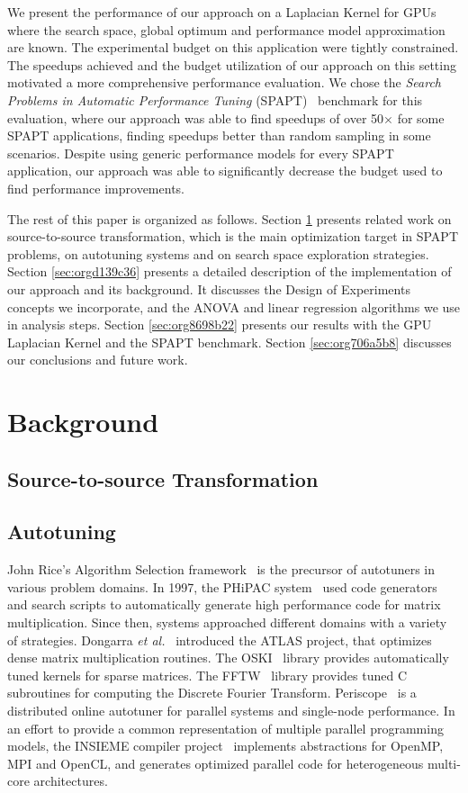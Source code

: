 \documentclass[conference]{IEEEtran}
\begin{document}
We present the performance of our approach on a Laplacian Kernel for GPUs where
the search space, global optimum and performance model approximation are known.
The experimental budget on this application were tightly constrained. The
speedups achieved and the budget utilization of our approach on this setting
motivated a more comprehensive performance evaluation. We chose the \emph{Search
Problems in Automatic Performance Tuning}
(SPAPT)~\cite{balaprakash2012spapt} benchmark for this evaluation, where
our approach was able to find speedups of over 50\(\times\) for some SPAPT
applications, finding speedups better than random sampling in some scenarios.
Despite using generic performance models for every SPAPT application, our
approach was able to significantly decrease the budget used to find performance
improvements.

The rest of this paper is organized as follows. Section \ref{sec:orgbef4f12} presents
related work on source-to-source transformation, which is the main optimization
target in SPAPT problems, on autotuning systems and on search space exploration
strategies. Section \ref{sec:orgd139c36} presents a
detailed description of the implementation of our approach and its background.
It discusses the Design of Experiments concepts we incorporate, and the ANOVA
and linear regression algorithms we use in analysis steps. Section \ref{sec:org8698b22} presents our results with the GPU Laplacian Kernel and the SPAPT
benchmark. Section \ref{sec:org706a5b8} discusses our conclusions and future work.
\section{Background}
\label{sec:orgbef4f12}
\subsection{Source-to-source Transformation}
\label{sec:org8648290}
\subsection{Autotuning}
\label{sec:org08db591}
John Rice's Algorithm Selection framework~\cite{rice1976algorithm} is the
precursor of autotuners in various problem domains. In 1997, the PHiPAC
system~\cite{bilmes1997optimizing} used code generators and search scripts
to automatically generate high performance code for matrix multiplication. Since
then, systems approached different domains with a variety of strategies.
Dongarra \emph{et al.}~\cite{dongarra1998automatically} introduced the ATLAS
project, that optimizes dense matrix multiplication routines. The
OSKI~\cite{vuduc2005oski} library provides automatically tuned kernels for
sparse matrices. The FFTW~\cite{frigo1998fftw} library provides tuned C
subroutines for computing the Discrete Fourier Transform.
Periscope~\cite{gerndt2010automatic} is a distributed online autotuner for
parallel systems and single-node performance. In an effort to provide a common
representation of multiple parallel programming models, the INSIEME compiler
project~\cite{jordan2012multi} implements abstractions for OpenMP, MPI and
OpenCL, and generates optimized parallel code for heterogeneous multi-core
architectures.
\end{document}
